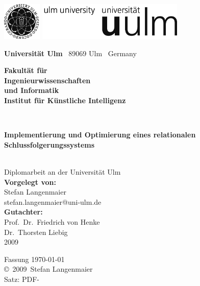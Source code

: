 \documentclass[a4paper,10pt,bibtotoc,twoside,openright,pointlessnumbers,normalheadings,DIV=9
,draft
]{scrbook}
\makeatletter
\newcommand{\fullname}{Stefan Langenmaier}
\newcommand{\email}{stefan.langenmaier@uni-ulm.de}
\newcommand{\titel}{Implementierung und Optimierung eines relationalen Schlussfolgerungssystems}
\newcommand{\jahr}{2009}
\newcommand{\gutachterA}{Prof.~Dr.~Friedrich von Henke}
\newcommand{\gutachterB}{Dr.~Thorsten Liebig}
\newcommand{\betreuer}{Dr.~Thorsten Liebig}
\newcommand{\fakultaet}{Ingenieurwissenschaften\\und Informatik}
\newcommand{\institut}{Institut für Künstliche Intelligenz}
\makeatother
\begin{document}
\frontmatter

\thispagestyle{empty}
\begin{addmargin*}[4mm]{-32mm}

\includegraphics[height=1.8cm]{images/unilogo_bild}
\hfill
\includegraphics[height=1.8cm]{images/unilogo_wort}\\[1em]

{\footnotesize
{\bfseries Universität Ulm} \textbar ~89069 Ulm \textbar ~Germany
\hspace*{78.5mm}\parbox[t]{38mm}{\bfseries Fakultät für\\
\fakultaet\\
\mdseries \institut}\\[2cm]

\parbox{140mm}{\bfseries \huge \titel}\\[0.5em]
{\footnotesize Diplomarbeit an der Universität Ulm}\\[3em]

{\footnotesize \bfseries Vorgelegt von:}\\
{\footnotesize \fullname\\\email}\\[2em]
{\footnotesize \bfseries Gutachter:}\\                     
{\footnotesize\gutachterA\\
\gutachterB}\\[2em]
{\footnotesize\jahr}
}
\end{addmargin*}


\clearpage
\thispagestyle{empty}
{ \small
  \flushleft
  Fassung \today \\\vfill
  \copyright~\jahr~\fullname\\[0.5em]

  Satz: PDF-\LaTeXe
}
\end{document}
